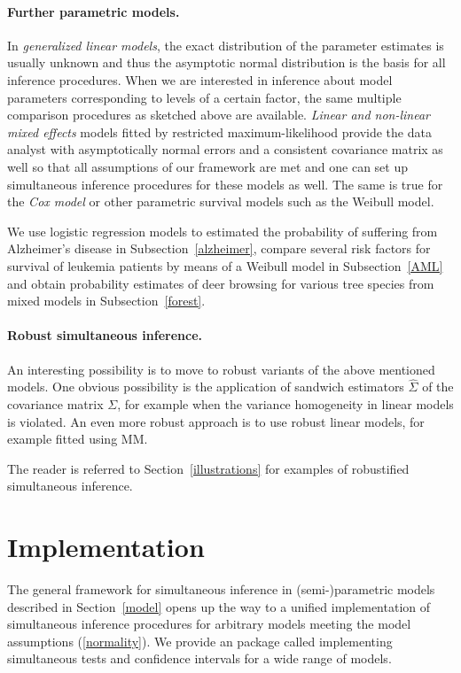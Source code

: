 \documentclass[12pt]{article}
\begin{document}
\paragraph{Further parametric models.}

In \emph{generalized linear models}, the exact distribution of the parameter estimates
is usually unknown and thus the asymptotic normal distribution is the basis for all
inference procedures. When we are interested in inference about model
parameters corresponding to levels of a certain factor, the same multiple 
comparison procedures as sketched above are available. 
\emph{Linear and non-linear mixed effects} models fitted by restricted
maximum-likelihood provide
the data analyst with asymptotically normal errors and a consistent
covariance matrix as well so that all assumptions of our framework
are met and one can set up simultaneous inference procedures
for these models as well.
The same is true for the \emph{Cox model} or other parametric survival models
such as the Weibull model.

We use logistic regression models to estimated the probability of suffering
from Alzheimer's disease in Subsection~\ref{alzheimer}, compare several risk
factors for survival of leukemia patients by means of a Weibull model in
Subsection~\ref{AML} and obtain probability estimates of deer browsing for
various tree species from mixed models in Subsection~\ref{forest}.

\paragraph{Robust simultaneous inference.}

An interesting possibility is to move to robust variants of the above
mentioned models. One obvious possibility is the application
of sandwich estimators $\hat{\Sigma}$ of the covariance matrix $\Sigma$, 
for example when the variance homogeneity in linear models is violated.
An even more robust approach is to use robust linear models, for example
fitted using MM.

The reader is referred to Section~\ref{illustrations} for examples of
robustified simultaneous inference.

\section{Implementation} \label{implementation}

The general framework for simultaneous inference in 
(semi-)parametric models described in Section~\ref{model}
opens up the way to a unified implementation of simultaneous inference
procedures for arbitrary models meeting the model assumptions 
(\ref{normality}). We provide an \RR{} \citep{R2007} package called 
 \citep{pkg:multcomp} implementing
simultaneous tests and confidence intervals for a wide range of models.
\end{document}
